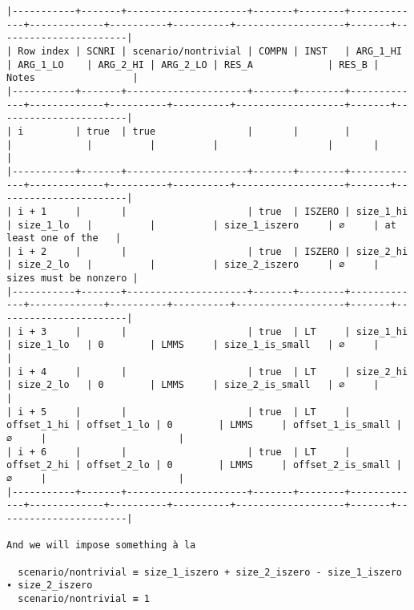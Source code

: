 \documentclass[varwidth=\maxdimen,margin=0.5cm,multi={verbatim}]{standalone}
\begin{document}
\begin{verbatim}
|-----------+-------+---------------------+-------+--------+-------------+-------------+----------+----------+-------------------+-------+-----------------------|
| Row index | SCNRI | scenario/nontrivial | COMPN | INST   | ARG_1_HI    | ARG_1_LO    | ARG_2_HI | ARG_2_LO | RES_A             | RES_B | Notes                 |
|-----------+-------+---------------------+-------+--------+-------------+-------------+----------+----------+-------------------+-------+-----------------------|
| i         | true  | true                |       |        |             |             |          |          |                   |       |                       |
|-----------+-------+---------------------+-------+--------+-------------+-------------+----------+----------+-------------------+-------+-----------------------|
| i + 1     |       |                     | true  | ISZERO | size_1_hi   | size_1_lo   |          |          | size_1_iszero     | ∅     | at least one of the   |
| i + 2     |       |                     | true  | ISZERO | size_2_hi   | size_2_lo   |          |          | size_2_iszero     | ∅     | sizes must be nonzero |
|-----------+-------+---------------------+-------+--------+-------------+-------------+----------+----------+-------------------+-------+-----------------------|
| i + 3     |       |                     | true  | LT     | size_1_hi   | size_1_lo   | 0        | LMMS     | size_1_is_small   | ∅     |                       |
| i + 4     |       |                     | true  | LT     | size_2_hi   | size_2_lo   | 0        | LMMS     | size_2_is_small   | ∅     |                       |
| i + 5     |       |                     | true  | LT     | offset_1_hi | offset_1_lo | 0        | LMMS     | offset_1_is_small | ∅     |                       |           
| i + 6     |       |                     | true  | LT     | offset_2_hi | offset_2_lo | 0        | LMMS     | offset_2_is_small | ∅     |                       |           
|-----------+-------+---------------------+-------+--------+-------------+-------------+----------+----------+-------------------+-------+-----------------------|

And we will impose something à la

  scenario/nontrivial ≡ size_1_iszero + size_2_iszero - size_1_iszero ∙ size_2_iszero
  scenario/nontrivial ≡ 1

\end{verbatim}
\end{document}
